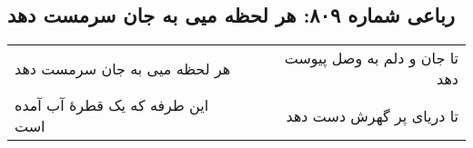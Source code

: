 \begin{center}
\section*{رباعی شماره ۸۰۹: هر لحظه میی به جان سرمست دهد}
\label{sec:0809}
\begin{longtable}{l p{0.5cm} r}
هر لحظه میی به جان سرمست دهد
&&
تا جان و دلم به وصل پیوست دهد
\\
این طرفه که یک قطرهٔ آب آمده است
&&
تا دریای پر گهرش دست دهد
\\
\end{longtable}
\end{center}
